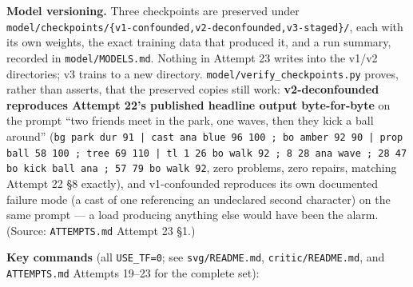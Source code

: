 \documentclass[11pt]{article}
\newcommand{\secsym}{\S}
\begin{document}
\textbf{Model versioning.} Three checkpoints are preserved under
\texttt{model/checkpoints/\{v1-confounded,v2-deconfounded,v3-staged\}/},
each with its own weights, the exact training data that produced it, and
a run summary, recorded in \texttt{model/MODELS.md}. Nothing in Attempt
23 writes into the v1/v2 directories; v3 trains to a new directory.
\texttt{model/verify\_checkpoints.py} proves, rather than asserts, that
the preserved copies still work: \textbf{v2-deconfounded reproduces
Attempt 22's published headline output byte-for-byte} on the prompt
``two friends meet in the park, one waves, then they kick a ball
around'' (\texttt{bg park dur 91 | cast ana blue 96 100 ; bo amber 92 90
| prop ball 58 100 ; tree 69 110 | tl 1 26 bo walk 92 ; 8 28 ana wave ;
28 47 bo kick ball ana ; 57 79 bo walk 92}, zero problems, zero repairs,
matching Attempt 22 \secsym8 exactly), and v1-confounded reproduces its
own documented failure mode (a cast of one referencing an undeclared
second character) on the same prompt --- a load producing anything else
would have been the alarm. (Source: \texttt{ATTEMPTS.md} Attempt 23
\secsym1.)

\textbf{Key commands} (all \texttt{USE\_TF=0}; see \texttt{svg/README.md},
\texttt{critic/README.md}, and \texttt{ATTEMPTS.md} Attempts 19--23 for
the complete set):
\end{document}
